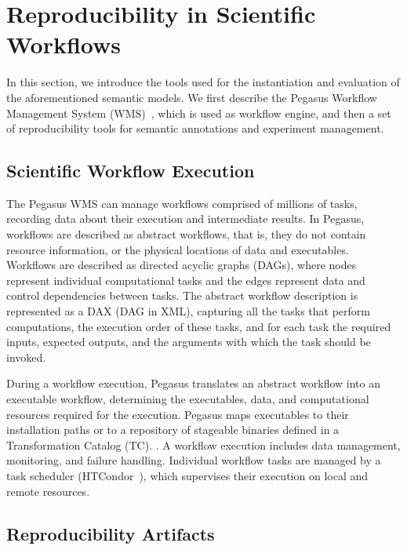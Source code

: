 \section{Reproducibility in Scientific Workflows}
\label{sec:reproducibility}

In this section, we introduce the tools used for the instantiation and evaluation 
of the aforementioned semantic models. We first describe the Pegasus Workflow 
Management System (WMS)~\cite{Deelman-FGCS-2014}, which is used as 
workflow engine, and then a set of reproducibility tools for semantic annotations and 
experiment management.


\subsection{Scientific Workflow Execution}

The Pegasus WMS can manage workflows comprised of millions of tasks, recording data 
about their execution and intermediate results. In Pegasus, workflows are described as 
abstract workflows, that is, they do not contain resource information, or the physical locations of 
data and executables. Workflows are described as directed acyclic graphs (DAGs), where 
nodes represent individual computational tasks and the edges represent data and control 
dependencies between tasks. The abstract workflow description is represented as a DAX 
(DAG in XML), capturing all the tasks that perform computations, the execution order of these 
tasks, and for each task the required inputs, expected outputs, and the arguments with which 
the task should be invoked. 

During a workflow execution, Pegasus translates an abstract workflow into an 
executable workflow, determining the executables, data, and computational resources 
required for the execution. Pegasus maps executables to their installation paths or to a 
repository of stageable binaries defined in a Transformation Catalog (TC). 
. A workflow 
execution includes data management, monitoring, and failure handling. Individual workflow 
tasks are managed by a task scheduler (HTCondor~\cite{condor}), which supervises their 
execution on local and remote resources.


\subsection{Reproducibility Artifacts}

